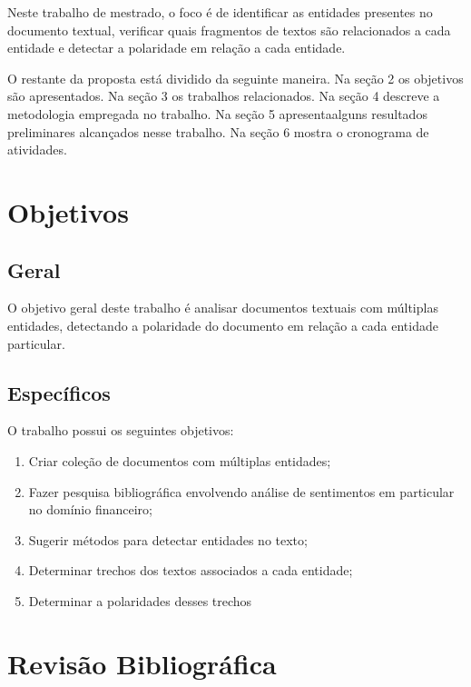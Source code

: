 \documentclass[a4paper,12pt]{article}
\begin{document}
Neste trabalho de mestrado, o foco é de identificar as entidades presentes no documento textual, verificar quais fragmentos de textos são relacionados a cada entidade e detectar a polaridade em relação a cada entidade.

O restante da proposta está dividido da seguinte maneira. Na seção 2 os objetivos são apresentados. Na seção 3 os trabalhos relacionados. Na seção 4 descreve a metodologia empregada no trabalho. Na seção 5 apresentaalguns resultados preliminares alcançados nesse trabalho. Na seção 6 mostra o cronograma de atividades.

\section{Objetivos}

\subsection{Geral}

O objetivo geral deste trabalho é analisar documentos textuais com múltiplas entidades, detectando a polaridade do documento em relação a cada entidade particular.

\subsection{Específicos}

O trabalho possui os seguintes objetivos:

\begin{enumerate}
  \item Criar coleção de documentos com múltiplas entidades;
  \item Fazer pesquisa bibliográfica envolvendo análise de sentimentos em particular no domínio financeiro;
  \item Sugerir métodos para detectar entidades no texto;
  \item Determinar trechos dos textos associados a cada entidade;
  \item Determinar a polaridades desses trechos
\end{enumerate}

\section{Revisão Bibliográfica}
\end{document}
